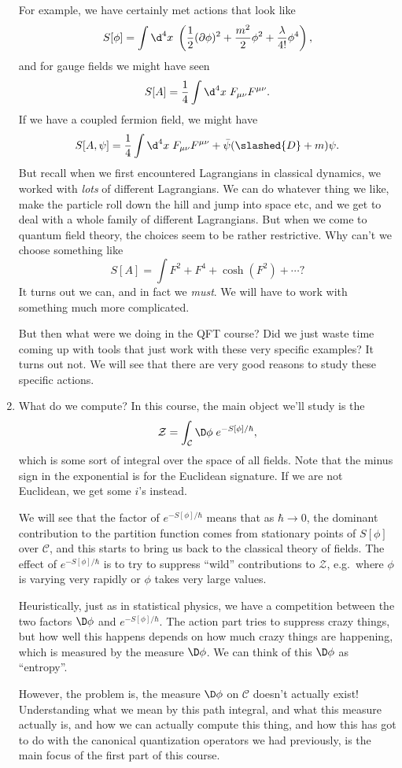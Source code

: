 \documentclass[a4paper]{article}
\begin{document}
\begin{enumerate}
    For example, we have certainly met actions that look like
    \[
      S[\phi] = \int \d^4 x\; \left(\frac{1}{2} (\partial \phi)^2 + \frac{m^2}{2} \phi^2 + \frac{\lambda}{4!} \phi^4\right),
    \]
    and for gauge fields we might have seen
    \[
      S[A] = \frac{1}{4} \int \d^4 x\; F_{\mu\nu}F^{\mu\nu}.
    \]
    If we have a coupled fermion field, we might have
    \[
      S[A, \psi] = \frac{1}{4} \int \d^4 x\; F_{\mu\nu}F^{\mu\nu} + \bar\psi (\slashed{D} + m) \psi.
    \]
    But recall when we first encountered Lagrangians in classical dynamics, we worked with \emph{lots} of different Lagrangians. We can do whatever thing we like, make the particle roll down the hill and jump into space etc, and we get to deal with a whole family of different Lagrangians. But when we come to quantum field theory, the choices seem to be rather restrictive. Why can't we choose something like
    \[
      S[A] = \int F^2 + F^4 + \cosh(F^2) + \cdots?
    \]
    It turns out we can, and in fact we \emph{must}. We will have to work with something much more complicated.

    But then what were we doing in the QFT course? Did we just waste time coming up with tools that just work with these very specific examples? It turns out not. We will see that there are very good reasons to study these specific actions.
  \item What do we compute? In this course, the main object we'll study is the 
    \[
      \mathcal{Z} = \int_\mathcal{C} \D \phi\; e^{-S[\phi]/\hbar},
    \]
    which is some sort of integral over the space of all fields. Note that the minus sign in the exponential is for the Euclidean signature. If we are not Euclidean, we get some $i$'s instead.

    We will see that the factor of $e^{-S[\phi]/\hbar}$ means that as $\hbar \to 0$, the dominant contribution to the partition function comes from stationary points of $S[\phi]$ over $\mathcal{C}$, and this starts to bring us back to the classical theory of fields. The effect of $e^{-S[\phi]/\hbar}$ is to try to suppress ``wild'' contributions to $\mathcal{Z}$, e.g.\ where $\phi$ is varying very rapidly or $\phi$ takes very large values.

     Heuristically, just as in statistical physics, we have a competition between the two factors $\D \phi$ and $e^{-S[\phi]/\hbar}$. The action part tries to suppress crazy things, but how well this happens depends on how much crazy things are happening, which is measured by the measure $\D \phi$. We can think of this $\D \phi$ as ``entropy''.

     However, the problem is, the measure $\D \phi$ on $\mathcal{C}$ doesn't actually exist! Understanding what we mean by this path integral, and what this measure actually is, and how we can actually compute this thing, and how this has got to do with the canonical quantization operators we had previously, is the main focus of the first part of this course.
\end{enumerate}
\end{document}

